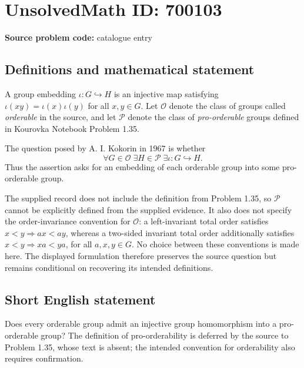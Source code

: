 \documentclass[11pt]{article}
\begin{document}
\section*{UnsolvedMath ID: 700103}
\textbf{Source problem code:} catalogue entry
\subsection{Definitions and mathematical statement}
A group embedding \(\iota:G\hookrightarrow H\) is an injective map satisfying \(\iota(xy)=\iota(x)\iota(y)\) for all \(x,y\in G\). Let \(\mathcal O\) denote the class of groups called \emph{orderable} in the source, and let \(\mathcal P\) denote the class of \emph{pro-orderable} groups defined in Kourovka Notebook Problem 1.35.

The question posed by A. I. Kokorin in 1967 is whether
\[
\forall G\in\mathcal O\;\exists H\in\mathcal P\;\exists\iota:G\hookrightarrow H.
\]
Thus the assertion asks for an embedding of each orderable group into some pro-orderable group.

The supplied record does not include the definition from Problem 1.35, so \(\mathcal P\) cannot be explicitly defined from the supplied evidence. It also does not specify the order-invariance convention for \(\mathcal O\): a left-invariant total order satisfies \(x<y\Rightarrow ax<ay\), whereas a two-sided invariant total order additionally satisfies \(x<y\Rightarrow xa<ya\), for all \(a,x,y\in G\). No choice between these conventions is made here. The displayed formulation therefore preserves the source question but remains conditional on recovering its intended definitions.
\subsection{Short English statement}
Does every orderable group admit an injective group homomorphism into a pro-orderable group? The definition of pro-orderability is deferred by the source to Problem 1.35, whose text is absent; the intended convention for orderability also requires confirmation.
\end{document}
